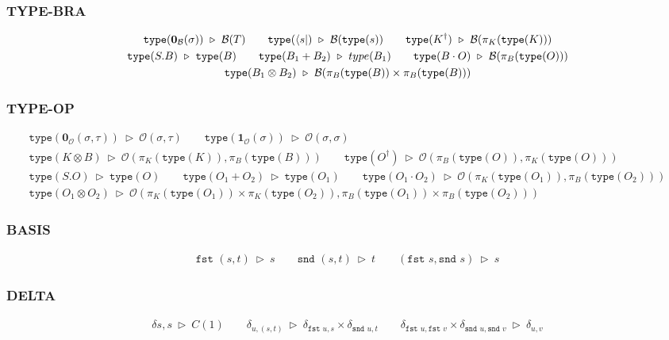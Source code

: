 \documentclass[manuscript, review, timestamp]{acmart}
\newcommand*{\type}{\texttt{type}}
\newcommand*{\fst}{\texttt{fst }}
\newcommand*{\snd}{\texttt{snd }}
\newcommand*{\reduce}{\ \triangleright\ }
\begin{document}
\subsubsection*{\textsf{TYPE-BRA}}
\begin{gather*}
  \type(\mathbf{0}_\mathcal{B}(\sigma)) \reduce \mathcal{B}(T)
  \qquad
  \type(\bra{s}) \reduce \mathcal{B}(\type(s))
  \qquad
  \type(K^\dagger) \reduce \mathcal{B}(\pi_K(\type(K)))
  \\
  \type(S . B) \reduce \type(B)
  \qquad
  \type(B_1 + B_2) \reduce type(B_1)
  \qquad
  \type(B \cdot O) \reduce \mathcal{B}(\pi_B(\type(O)))
  \\
  \type(B_1 \otimes B_2) \reduce \mathcal{B}(\pi_B(\type(B)) \times \pi_B(\type(B)))
\end{gather*}

\subsubsection*{\textsf{TYPE-OP}}
\begin{gather*}
  \type(\mathbf{0}_\mathcal{O}(\sigma, \tau)) \reduce \mathcal{O}(\sigma, \tau)
  \qquad
  \type(\mathbf{1}_\mathcal{O}(\sigma)) \reduce \mathcal{O}(\sigma, \sigma)
  \\
  \type(K \otimes B) \reduce \mathcal{O}(\pi_K(\type(K)), \pi_B(\type(B)))
  \qquad
  \type(O^\dagger) \reduce \mathcal{O}(\pi_B(\type(O)), \pi_K(\type(O)))
  \\
  \type(S . O) \reduce \type(O)
  \qquad
  \type(O_1 + O_2) \reduce \type(O_1)
  \qquad
  \type(O_1 \cdot O_2) \reduce \mathcal{O}(\pi_K(\type(O_1)), \pi_B(\type(O_2)))
  \\
  \type(O_1 \otimes O_2) \reduce \mathcal{O}(\pi_K(\type(O_1)) \times \pi_K(\type(O_2)), \pi_B(\type(O_1)) \times \pi_B(\type(O_2)))
\end{gather*}


\subsubsection*{\textsf{BASIS}}
\begin{gather*}
    \fst (s, t) \reduce s
    \qquad
    \snd (s, t) \reduce t
    \qquad
    (\fst s, \snd s) \reduce s
\end{gather*}

\subsubsection*{\textsf{DELTA}}
\begin{gather*}
  \delta{s, s} \reduce C(1)
  \qquad
  \delta_{u, (s, t)} \reduce \delta_{\fst u, s} \times \delta_{\snd u, t} 
  \qquad
  \delta_{\fst u, \fst v}\times\delta_{\snd u, \snd v} \reduce \delta_{u, v}
\end{gather*}
\end{document}
